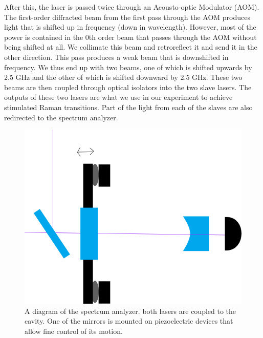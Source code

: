 After this, the laser is passed twice through an Acousto-optic Modulator (AOM). The first-order diffracted beam from the first pass through the AOM produces light that is shifted up in frequency (down in wavelength). However, most of the power is contained in the 0th order beam that passes through the AOM without being shifted at all. We collimate this beam and retroreflect it and send it in the other direction. This pass produces a weak beam that is downshifted in frequency. We thus end up with two beams, one of which is shifted upwards by 2.5 GHz and the other of which is shifted downward by 2.5 GHz. These two beams are then coupled through optical isolators into the two slave lasers. The outputs of these two lasers are what we use in our experiment to achieve stimulated Raman transitions. Part of the light from each of the slaves are also redirected to the spectrum analyzer.


\begin{figure}
    \centerline{\includegraphics[totalheight=0.3\textheight ]{spectrumAnalyzer}}
    \caption[]{\label{fig:spectrumAnalyzer}
    A diagram of the spectrum analyzer. both lasers are coupled to the cavity. One of the mirrors is mounted on piezoelectric devices that allow fine control of its motion. 
}
\end{figure} 

